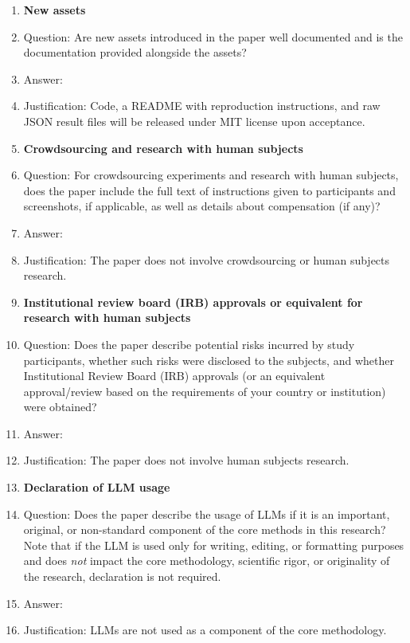\begin{enumerate}
\item {\bf New assets}
    \item[] Question: Are new assets introduced in the paper well documented and is the documentation provided alongside the assets?
    \item[] Answer: \answerYes{}
    \item[] Justification: Code, a README with reproduction instructions, and raw JSON result files will be released under MIT license upon acceptance.

\item {\bf Crowdsourcing and research with human subjects}
    \item[] Question: For crowdsourcing experiments and research with human subjects, does the paper include the full text of instructions given to participants and screenshots, if applicable, as well as details about compensation (if any)?
    \item[] Answer: \answerNA{}
    \item[] Justification: The paper does not involve crowdsourcing or human subjects research.

\item {\bf Institutional review board (IRB) approvals or equivalent for research with human subjects}
    \item[] Question: Does the paper describe potential risks incurred by study participants, whether such risks were disclosed to the subjects, and whether Institutional Review Board (IRB) approvals (or an equivalent approval/review based on the requirements of your country or institution) were obtained?
    \item[] Answer: \answerNA{}
    \item[] Justification: The paper does not involve human subjects research.

\item {\bf Declaration of LLM usage}
    \item[] Question: Does the paper describe the usage of LLMs if it is an important, original, or non-standard component of the core methods in this research? Note that if the LLM is used only for writing, editing, or formatting purposes and does \emph{not} impact the core methodology, scientific rigor, or originality of the research, declaration is not required.
    \item[] Answer: \answerNA{}
    \item[] Justification: LLMs are not used as a component of the core methodology.

\end{enumerate}
